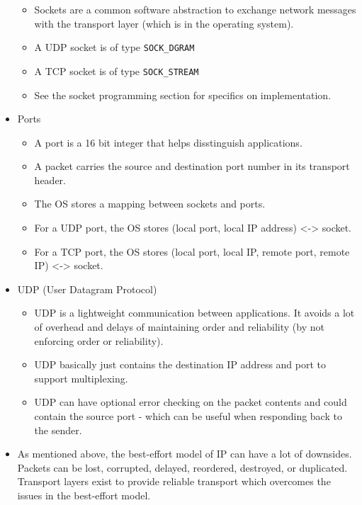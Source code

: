\documentclass[]{article}
\providecommand{\tightlist}{%
  \setlength{\itemsep}{0pt}\setlength{\parskip}{0pt}}
\begin{document}
\begin{itemize}
  \begin{itemize}
  \tightlist
  \item
    Sockets are a common software abstraction to exchange network
    messages with the transport layer (which is in the operating
    system).
  \item
    A UDP socket is of type \texttt{SOCK\_DGRAM}
  \item
    A TCP socket is of type \texttt{SOCK\_STREAM}
  \item
    See the socket programming section for specifics on implementation.
  \end{itemize}
\item
  Ports

  \begin{itemize}
  \tightlist
  \item
    A port is a 16 bit integer that helps disstinguish applications.
  \item
    A packet carries the source and destination port number in its
    transport header.
  \item
    The OS stores a mapping between sockets and ports.
  \item
    For a UDP port, the OS stores (local port, local IP address)
    \textless{}-\textgreater{} socket.
  \item
    For a TCP port, the OS stores (local port, local IP, remote port,
    remote IP) \textless{}-\textgreater{} socket.
  \end{itemize}
\item
  UDP (User Datagram Protocol)

  \begin{itemize}
  \tightlist
  \item
    UDP is a lightweight communication between applications. It avoids a
    lot of overhead and delays of maintaining order and reliability (by
    not enforcing order or reliability).
  \item
    UDP basically just contains the destination IP address and port to
    support multiplexing.
  \item
    UDP can have optional error checking on the packet contents and
    could contain the source port - which can be useful when responding
    back to the sender.
  \end{itemize}
\item
  As mentioned above, the best-effort model of IP can have a lot of
  downsides. Packets can be lost, corrupted, delayed, reordered,
  destroyed, or duplicated. Transport layers exist to provide reliable
  transport which overcomes the issues in the best-effort model.


\end{itemize}
\end{document}
